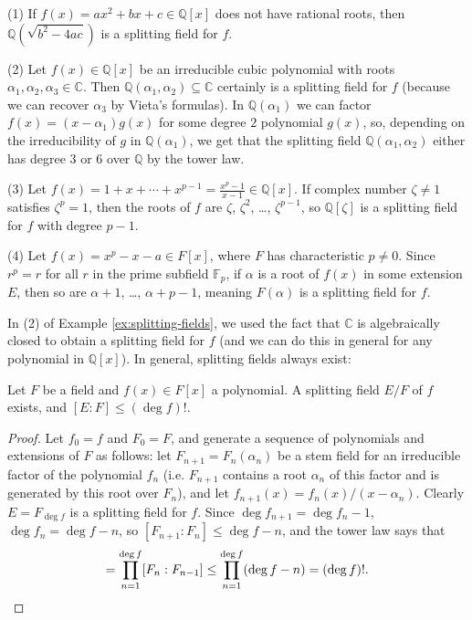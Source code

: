 \documentclass[10pt]{article}
\providecommand{\CC}{\mathbb C}
\providecommand{\FF}{\mathbb F}
\providecommand{\QQ}{\mathbb Q}
\begin{document}
\begin{example}
    \label{ex:splitting-fields}
    (1) If $f(x) = ax^2 + bx + c\in\QQ[x]$ does not have rational roots,
    then $\QQ(\sqrt{b^2 - 4ac})$ is a splitting field for $f$.

    (2) Let $f(x)\in\QQ[x]$ be an irreducible cubic polynomial
    with roots $\alpha_1,\alpha_2,\alpha_3\in\CC$.
    Then $\QQ(\alpha_1,\alpha_2)\subseteq\CC$
    certainly is a splitting field for $f$
    (because we can recover $\alpha_3$ by Vieta's formulas).
    In $\QQ(\alpha_1)$ we can factor $f(x) = (x-\alpha_1)g(x)$
    for some degree $2$ polynomial $g(x)$, so,
    depending on the irreducibility of $g$ in $\QQ(\alpha_1)$,
    we get that the splitting field $\QQ(\alpha_1,\alpha_2)$
    either has degree $3$ or $6$ over $\QQ$ by the tower law.

    (3) Let $f(x) = 1 + x + \cdots + x^{p-1} = \frac{x^p - 1}{x-1}\in\QQ[x]$.
    If complex number $\zeta\ne 1$ satisfies $\zeta^p = 1$,
    then the roots of $f$ are $\zeta$, $\zeta^2$, \dots, $\zeta^{p-1}$,
    so $\QQ[\zeta]$ is a splitting field for $f$ with degree $p-1$.

    (4) Let $f(x) = x^p - x - a\in F[x]$,
    where $F$ has characteristic $p\ne 0$.
    Since $r^p = r$ for all $r$ in the prime subfield $\FF_p$,
    if $\alpha$ is a root of $f(x)$ in some extension $E$,
    then so are $\alpha+1$, \dots, $\alpha+p-1$,
    meaning $F(\alpha)$ is a splitting field for $f$.
\end{example}

In (2) of Example \ref{ex:splitting-fields},
we used the fact that $\CC$ is algebraically closed
to obtain a splitting field for $f$
(and we can do this in general for any polynomial in $\QQ[x]$).
In general, splitting fields always exist:
\begin{prop}
    \label{prop:splitting-fields-exist}
    Let $F$ be a field and $f(x)\in F[x]$ a polynomial.
    A splitting field $E/F$ of $f$ exists,
    and $[E : F]\le (\deg f)!$.
\end{prop}

\begin{proof}
    Let $f_0 = f$ and $F_0 = F$, and generate a sequence
    of polynomials and extensions of $F$ as follows:
    let $F_{n+1} = F_n(\alpha_n)$
    be a stem field for an irreducible factor of
    the polynomial $f_n$ (i.e. $F_{n+1}$ contains a root $\alpha_n$ of
    this factor and is generated by this root over $F_n$),
    and let $f_{n+1}(x) = f_n(x)/(x-\alpha_n)$.
    Clearly $E = F_{\deg f}$ is a splitting field for $f$.
    Since $\deg f_{n+1} = \deg f_n - 1$,
    $\deg f_n = \deg f - n$, so $[F_{n+1} : F_n]\le \deg f - n$,
    and the tower law says that
    \begin{equation*}
	[E : F] = \prod_{n=1}^{\deg f}[F_n : F_{n-1}]
	\le \prod_{n=1}^{\deg f} (\deg f - n) = (\deg f)!.\qedhere
    \end{equation*}
\end{proof}
\end{document}
